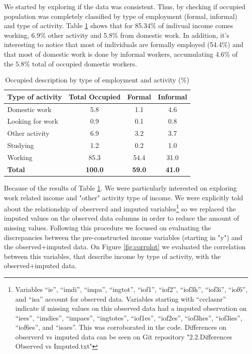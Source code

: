 \documentclass[a4paper,12pt]{article}
\begin{document}
We started by exploring if the data was consistent. Thus, by checking if occupied population was completely classified by type of employment (formal, informal) and type of activity. Table \ref{tab:ocu_data} shows that for 85.34$\%$ of indivual income comes working, 6.9$\%$ other activity and 5.8$\%$  from domestic work. In addition, it's interesting to notice that most of individuals are formally employed (54.4$\%$) and that most of domestic work is done by informal workers, accumulating 4.6$\%$ of the $5.8\%$ total of occupied domestic workers.

\begin{table}[H]
    \centering
    \caption{Occupied description by type of employment and activity (\%)}
    \label{tab:ocu_data}
    \small 
    \renewcommand{\arraystretch}{0.8} 
    \begin{tabular}{|l|c|c|c|}
        \hline
        \textbf{Type of activity} & \textbf{Total Occupied} & \textbf{Formal} & \textbf{Informal} \\
        \hline
        Domestic work & 5.8 & 1.1 & 4.6 \\
        Looking for work & 0.9 & 0.1 & 0.8 \\
        Other activity & 6.9 & 3.2 & 3.7 \\
        Studying & 1.2 & 0.2 & 1.0 \\
        Working & 85.3 & 54.4 & 31.0 \\
        \hline
        \textbf{Total} & \textbf{100.0} & \textbf{59.0} & \textbf{41.0} \\
        \hline
    \end{tabular}
    \raggedleft %
    \scriptsize %
\end{table}

Because of the results of Table \ref{tab:ocu_data}. We were particularly interested on exploring work related income and "other" activity type of income. We were explicitly told about the relationship  of observerd and imputed variables\footnote{Variables ``ie'', ``imdi'', ``impa'', ``ingtot'', ``iof1'', ``iof2'', ``iof3h'', ``iof3i'', ``iof6'', and ``isa'' account for observed data. Variables starting with ``ccclasnr'' indicate if missing values on this observed data had a imputed observation on ``iees'', ``imdies'', ``impaes'', ``ingtotes'', ``iof1es'', ``iof2es'', ``iof3hes'', ``iof3ies'', ``iof6es'', and ``isaes''. This was corroborated in the code. Differences on observerd vs imputed data can be seen on Git repository "2.2.Differences Observed vs Imputed.txt"} so we replaced the imputed values on the observed data columns in order to reduce the amount of missing values. Following this procedure we focused on evaluating the discrepancies between the pre-constructed income variables (starting in "y") and the observed+imputed data. On Figure \ref{fig:corrplot} we evaluated the correlation between this variables, that describe income by type of activity, with the observed+imputed data. 
\end{document}
